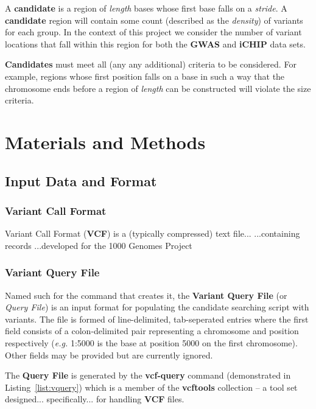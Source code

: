 A \textbf{candidate} is a region of \textit{length} bases whose first base falls
on a \textit{stride}. A \textbf{candidate} region will contain some count
(described as the \textit{density}) of variants for each group. In the context
of this project we consider the number of variant locations that fall within
this region for both the \textbf{GWAS} and \textbf{iCHIP} data sets.

\textbf{Candidates} must meet all (any any additional) criteria to be considered.
For example, regions whose first position falls on a base in such a way that the
chromosome ends before a region of \textit{length} can be constructed will
violate the size criteria.


\chapter{Materials and Methods}
\section{Input Data and Format}
\label{chap:part2:input}

\subsection{Variant Call Format}

Variant Call Format (\textbf{VCF}) is a (typically compressed) text file...
...containing records
...developed for the 1000 Genomes Project

\subsection{Variant Query File}
\label{sec:vqf}

Named such for the command that creates it, the \textbf{Variant Query File} (or
\textit{Query File}) is an input format for populating the candidate searching
script with variants. The file is formed of line-delimited, tab-seperated
entries where the first field consists of a colon-delimited pair representing a
chromosome and position respectively (\textit{e.g.} 1:5000 is the base at
position 5000 on the first chromosome). Other fields may be provided but are
currently ignored.

The \textbf{Query File} is generated by the \textbf{vcf-query} command
(demonstrated in Listing~\ref{list:vquery}) which is a member of the
\textbf{vcftools} collection -- a tool set designed...  specifically... for
handling \textbf{VCF} files.

